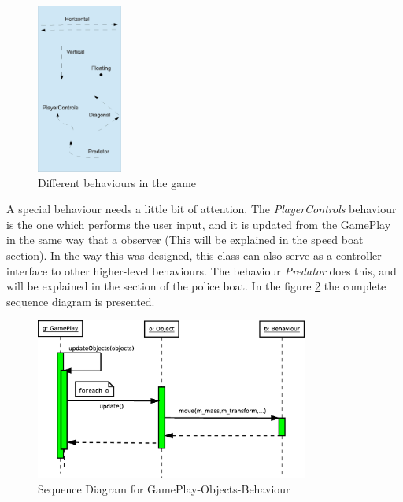 \documentclass[]{article}
\begin{document}
\begin{figure}[!htb]
\begin{center}
\includegraphics[width=0.25\textwidth]{images/behaviours.eps}
\caption{Different behaviours in the game}
\label{fig:behaviours}
\end{center}
\end{figure}

A special behaviour needs a little bit of attention. The \emph{PlayerControls} behaviour is the one which performs the user input, and it is updated from the GamePlay in the same way that a observer
(This will be explained in the speed boat section).
In the way this was designed, this class can also serve as a controller interface to other higher-level behaviours. The behaviour \emph{Predator} does this, and will be explained in the section of the police boat.
In the figure \ref{fig:straSeq} the complete sequence diagram is presented.\\

\begin{figure}[!htb]
\begin{center}
\includegraphics[width=0.8\textwidth]{images/strategySequence.eps}
\caption{Sequence Diagram for GamePlay-Objects-Behaviour}
\label{fig:straSeq}
\end{center}
\end{figure}
\end{document}
